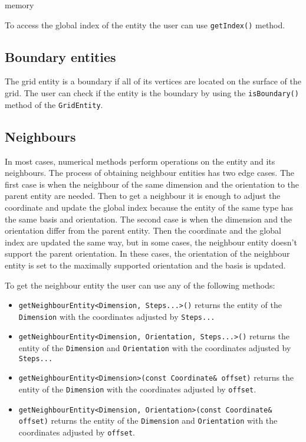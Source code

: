 {memory}

To access the global index of the entity the user can use \texttt{getIndex()} method.

\subsection{Boundary entities}

The grid entity is a boundary if all of its vertices are located on the surface of the grid.
The user can check if the entity is the boundary by using the \texttt{isBoundary()} method of the \texttt{GridEntity}.

\subsection{Neighbours}

In most cases, numerical methods perform operations on the entity and its neighbours.
The process of obtaining neighbour entities has two edge cases.
The first case is when the neighbour of the same dimension and the orientation to the parent entity are needed.
Then to get a neighbour it is enough to adjust the coordinate and update the global index because the entity of the same type has the same basis and orientation.
The second case is when the dimension and the orientation differ from the parent entity.
Then the coordinate and the global index are updated the same way, but in some cases, the neighbour entity doesn't support the parent orientation.
In these cases, the orientation of the neighbour entity is set to the maximally supported orientation and the basis is updated.

To get the neighbour entity the user can use any of the following methods:

\begin{itemize}
 \item{ \texttt{getNeighbourEntity<Dimension, Steps...>()} } returns the entity of the \texttt{Dimension} with the coordinates adjusted by \texttt{Steps...}
 \item{ \texttt{getNeighbourEntity<Dimension, Orientation, Steps...>()} } returns the entity of the \texttt{Dimension} and \texttt{Orientation} with the coordinates adjusted by \texttt{Steps...}
 \item{ \texttt{getNeighbourEntity<Dimension>(const Coordinate\& offset)} } returns the entity of the \texttt{Dimension} with the coordinates adjusted by \texttt{offset}.
 \item{ \texttt{getNeighbourEntity<Dimension, Orientation>(const Coordinate\& offset)} } returns the entity of the \texttt{Dimension} and \texttt{Orientation} with the coordinates adjusted by \texttt{offset}.
\end{itemize}

